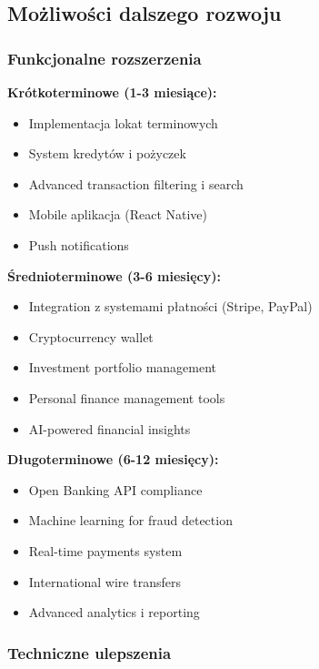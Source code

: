 \documentclass[12pt,a4paper]{article}
\begin{document}
    \subsection{Możliwości dalszego rozwoju}

    \subsubsection{Funkcjonalne rozszerzenia}

    \textbf{Krótkoterminowe (1-3 miesiące):}
    \begin{itemize}
        \item Implementacja lokat terminowych
        \item System kredytów i pożyczek
        \item Advanced transaction filtering i search
        \item Mobile aplikacja (React Native)
        \item Push notifications
    \end{itemize}

    \textbf{Średnioterminowe (3-6 miesięcy):}
    \begin{itemize}
        \item Integration z systemami płatności (Stripe, PayPal)
        \item Cryptocurrency wallet
        \item Investment portfolio management
        \item Personal finance management tools
        \item AI-powered financial insights
    \end{itemize}

    \textbf{Długoterminowe (6-12 miesięcy):}
    \begin{itemize}
        \item Open Banking API compliance
        \item Machine learning for fraud detection
        \item Real-time payments system
        \item International wire transfers
        \item Advanced analytics i reporting
    \end{itemize}

    \subsubsection{Techniczne ulepszenia}
\end{document}
